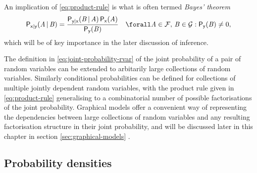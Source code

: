 An implication of \eqref{eq:product-rule} is what is often termed \emph{Bayes' theorem}
\begin{equation}\label{eq:bayes-theorem}
\begin{split}
  \prob{\rvar{x}|\rvar{y}}(\set{A} \gvn \set{B}) =
  \frac
    {\prob{\rvar{y}|\rvar{x}}(\set{B} \gvn \set{A}) \, \prob{\rvar{x}}(\set{A})}
    {\prob{\rvar{y}}(\set{B})} 
  \quad
  \forall \set{A} \in \sset{F},\,
  \set{B} \in \sset{G} : \prob{\rvar{y}}(\set{B}) \neq 0,
\end{split}
\end{equation}
which will be of key importance in the later discussion of inference.

The definition in \eqref{eq:joint-probability-rvar} of the joint probability of a pair of random variables can be extended to arbitarily large collections of random variables. Similarly conditional probabilities can be defined for collections of multiple jointly dependent random variables, with the product rule given in \eqref{eq:product-rule} generalising to a combinatorial number of possible factorisations of the joint probability. Graphical models offer a convenient way of representing the dependencies between large collections of random variables and any resulting factorisation structure in their joint probability, and will be discussed later in this chapter in section \ref{sec:graphical-models} .

\subsection{Probability densities}\label{subsec:probability-densities}

